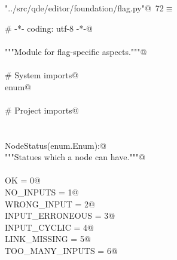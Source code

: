 \documentclass[
    a4paper,      %
    10pt,         %
    openright,    %
    notitlepage,  %
    parskip=half, %
]{scrreprt}       %
\theoremstyle{definition}                    %
\begin{document}
\begin{flushleft} \small
\begin{minipage}{\linewidth}\label{scrap125}\raggedright\small
{} \verb@"../src/qde/editor/foundation/flag.py"@\nobreak\ {\footnotesize {72}}$\equiv$
\vspace{-1ex}
\begin{list}{}{} \item
\mbox{}\lstinline@# -*- coding: utf-8 -*-@\\
\mbox{}\lstinline@@\\
\mbox{}\lstinline@"""Module for flag-specific aspects."""@\\
\mbox{}\lstinline@@\\
\mbox{}\lstinline@# System imports@\\
\mbox{}\lstinline@import enum@\\
\mbox{}\lstinline@@\\
\mbox{}\lstinline@# Project imports@\\
\mbox{}\lstinline@@\\
\mbox{}\lstinline@@\\
\mbox{}\lstinline@class NodeStatus(enum.Enum):@\\
\mbox{}\lstinline@    """Statues which a node can have."""@\\
\mbox{}\lstinline@@\\
\mbox{}\lstinline@    OK              = 0@\\
\mbox{}\lstinline@    NO_INPUTS       = 1@\\
\mbox{}\lstinline@    WRONG_INPUT     = 2@\\
\mbox{}\lstinline@    INPUT_ERRONEOUS = 3@\\
\mbox{}\lstinline@    INPUT_CYCLIC    = 4@\\
\mbox{}\lstinline@    LINK_MISSING    = 5@\\
\mbox{}\lstinline@    TOO_MANY_INPUTS = 6@\\
\mbox{}\lstinline@@{\NWsep}
\end{list}
\vspace{-1.5ex}
\footnotesize
\begin{list}{}{\setlength{\itemsep}{-\parsep}\setlength{\itemindent}{-\leftmargin}}

\item{}
\end{list}
\end{minipage}\vspace{4ex}
\end{flushleft}
\end{document}
